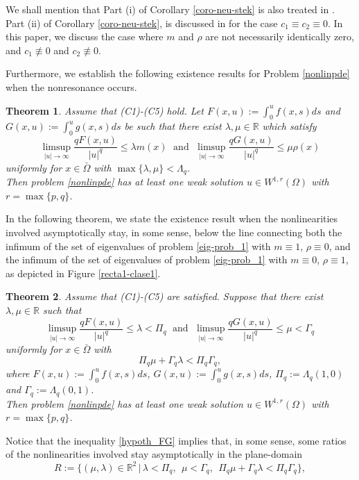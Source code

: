 \documentclass[pdflatex,sn-mathphys-num]{sn-jnl}
\theoremstyle{thmstyleone}%
\newtheorem{theorem}{Theorem}
\theoremstyle{thmstyletwo}%
\theoremstyle{thmstylethree}%
\theoremstyle{thmstylethree}%
\begin{document}
 We shall mention that Part (i) of Corollary \ref{coro-neu-stek}  is also treated in \cite[Theorem 1]{BLMG}. Part (ii) of Corollary \ref{coro-neu-stek},  is discussed in \cite[Theorem 1.1]{MM} for the case $c_1\equiv c_2\equiv 0$. In this paper, we discuss the case where $m$ and $\rho $ are not necessarily identically zero, and $c_1\not\equiv 0$ and $c_2\not\equiv 0$. 
 
 Furthermore, we establish the following existence results for Problem \eqref{nonlinpde} when the nonresonance occurs. 

 
 \begin{theorem}\label{main_theo}
    Assume that (C1)-(C5) hold. Let $F(x,u):=\int_0^uf(x,s)ds$  and $G(x,u):=\int_0^ug(x,s)ds$ 
 be such that there exist $\lambda,\mu \in \mathbb{R}$ which satisfy 
\begin{equation}\label{hypoth_FG}
        \limsup_{|u|\to \infty}\frac{qF(x,u)}{|u|^q}\leq \lambda m(x) \;\mbox{ and }\;   \limsup_{|u|\to \infty}\frac{qG(x,u)}{|u|^q}\leq \mu \rho(x)
    \end{equation}
    uniformly for $x\in \bar{\Omega}$ with $\max\{\lambda, \mu\}<\Lambda_q $.  \\
    Then problem \eqref{nonlinpde} has at least one weak solution $u\in W^{1,r}(\Omega)$ with $r=\max\{p,q\}$.
\end{theorem}


In the following theorem, we state the existence result when the nonlinearities involved asymptotically stay, in some sense, below the line connecting both the infimum of the set of eigenvalues of problem \eqref{eig-prob_1} with $m\equiv1$, $\rho \equiv0$, and the infimum of the set of eigenvalues of problem \eqref{eig-prob_1} with $m\equiv0$, $\rho \equiv 1$, as depicted in Figure \ref{recta1-clase1}.
\begin{theorem}\label{main_theo2}
    Assume that (C1)-(C5) are satisfied. Suppose that there exist $\lambda,\mu \in \mathbb{R}$ such that 
    \begin{equation}\label{hypoth_FG_2}
        \limsup_{|u|\to \infty}\frac{qF(x,u)}{|u|^q}\leq \lambda<\Pi_q \;\mbox{ and }\;   \limsup_{|u|\to \infty}\frac{qG(x,u)}{|u|^q}\leq \mu<\Gamma_q 
    \end{equation}
    uniformly for $x\in \bar{\Omega}$ with 
    \begin{equation}\label{hypoth_FG_3}
     \Pi_q \mu+\Gamma_q\lambda<\Pi_q \Gamma_q  , 
    \end{equation}
     where  $F(x,u):=\int_0^uf(x,s)ds$, $G(x,u):=\int_0^ug(x,s)ds$,  $\Pi_q:= \Lambda_q(1,0)$ and $\Gamma_q:= \Lambda_q(0,1)$.  \\
    Then problem \eqref{nonlinpde} has at least one weak solution $u\in W^{1,r}(\Omega)$ with $r=\max\{p,q\}$. 
\end{theorem}
Notice that the inequality \eqref{hypoth_FG} implies that, in some sense, some ratios of the nonlinearities involved
stay asymptotically in the plane-domain
\begin{equation*}
    R:=\{(\mu, \lambda)\in \mathbb{R}^2\,|\, \lambda <\Pi_q,\ \  \mu<\Gamma_q ,\ \  \Pi_q  \mu+\Gamma_q\lambda<\Pi_q \Gamma_q \},
\end{equation*}
\end{document}
